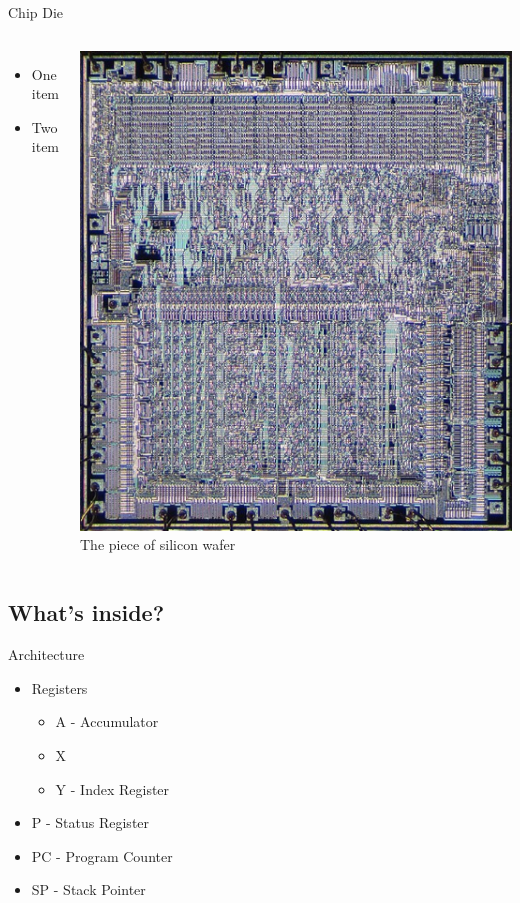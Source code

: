 \documentclass{beamer}
\begin{document}
\begin{frame}{Chip Die}
  \begin{columns}
    \begin{itemize}
    \item
      One item
    \item
      Two item
    \end{itemize}

    \begin{center}
      \includegraphics[scale=0.25]{../assets/MOS_6502_die.eps}
      \cite{MOS6502Die} The piece of silicon wafer 

    \end{center}
  \end{columns}
\end{frame}


\subsection[Internals]{What's inside?}

\begin{frame}{Architecture}
  \begin{itemize}
  \item
    Registers
    \begin{itemize}
    \item
      A - Accumulator
    \item
      X
    \item
      Y - Index Register
    \end{itemize}
  \item
    P - Status Register
  \item
    PC - Program Counter
  \item
    SP - Stack Pointer
  \end{itemize}
\end{frame}
\end{document}
